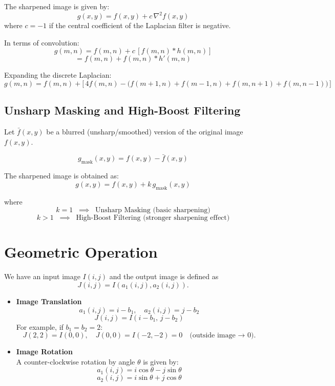 The sharpened image is given by:
\[
g(x,y) = f(x,y) + c \, \nabla^2 f(x,y)
\]
where $c = -1$ if the central coefficient of the Laplacian filter is negative.

In terms of convolution:
\[
g(m,n) = f(m,n) + c \, [f(m,n) \ast h(m,n)]
\]
\[
= f(m,n) + f(m,n) \ast h'(m,n)
\]

Expanding the discrete Laplacian:
\[
g(m,n) = f(m,n) + \Big[\,4f(m,n) - \big(f(m+1,n) + f(m-1,n) + f(m,n+1) + f(m,n-1)\big)\,\Big]
\]

\subsection*{Unsharp Masking and High-Boost Filtering}

Let $\bar{f}(x,y)$ be a blurred (unsharp/smoothed) version of the original image $f(x,y)$.  

\[
g_{\text{mask}}(x,y) = f(x,y) - \bar{f}(x,y)
\]

The sharpened image is obtained as:  
\[
g(x,y) = f(x,y) + k \, g_{\text{mask}}(x,y)
\]

where  
\[
k = 1 \;\; \implies \;\; \text{Unsharp Masking (basic sharpening)}
\]  
\[
k > 1 \;\; \implies \;\; \text{High-Boost Filtering (stronger sharpening effect)}
\]

\section{Geometric Operation}

We have an input image $I(i,j)$ and the output image is defined as  
\[
J(i,j) = I(a_1(i,j), a_2(i,j)).
\]

\begin{itemize}
    \item \textbf{Image Translation}\\
    \[
    a_1(i,j) = i - b_1, \quad a_2(i,j) = j - b_2
    \]
    \[
    J(i,j) = I(i-b_1,\, j-b_2)
    \]
    For example, if $b_1 = b_2 = 2$:  
    \[
    J(2,2) = I(0,0), \quad J(0,0) = I(-2,-2) = 0 \quad \text{(outside image → 0)}.
    \]

    \item \textbf{Image Rotation}\\
    A counter-clockwise rotation by angle $\theta$ is given by:
    \[
    a_1(i,j) = i\cos\theta - j\sin\theta
    \]
    \[
    a_2(i,j) = i\sin\theta + j\cos\theta
    \]
\end{itemize}
